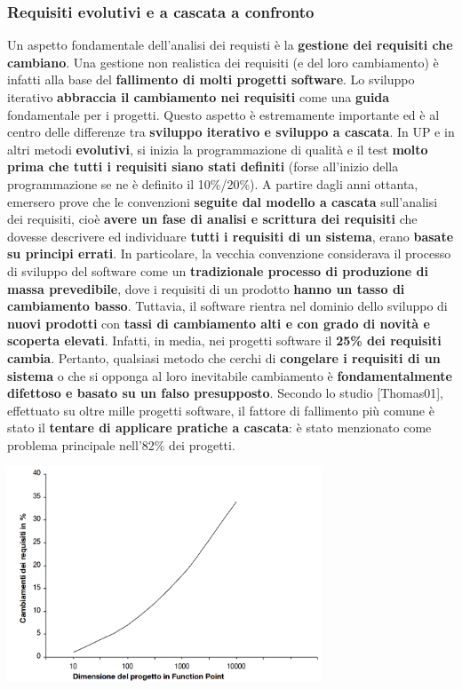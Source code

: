 \documentclass[12pt]{article}
\begin{document}
\subsubsection{Requisiti evolutivi e a cascata a confronto}
Un aspetto fondamentale dell'analisi dei requisti è la \textbf{gestione dei requisiti che cambiano}. Una gestione non realistica dei requisiti (e del loro cambiamento) è infatti alla base del \textbf{fallimento di molti progetti software}.
Lo sviluppo iterativo \textbf{abbraccia il cambiamento nei requisiti} come una \textbf{guida} fondamentale per i progetti. Questo aspetto è estremamente importante ed è al centro delle differenze tra \textbf{sviluppo iterativo e sviluppo a cascata}.
In UP e in altri metodi \textbf{evolutivi}, si inizia la programmazione di qualità e il test \textbf{molto prima che tutti i requisiti siano stati definiti} (forse all'inizio della programmazione se ne è definito il 10\%/20\%).
A partire dagli anni ottanta, emersero prove che le convenzioni \textbf{seguite dal modello a cascata} sull'analisi dei requisiti, cioè \textbf{avere un fase di analisi e scrittura dei requisiti} che dovesse descrivere ed individuare \textbf{tutti i requisiti di un sistema}, erano \textbf{basate su principi errati}.
In particolare, la vecchia convenzione considerava il processo di sviluppo del software come un \textbf{tradizionale processo di produzione di massa prevedibile}, dove i requisiti di un prodotto \textbf{hanno un tasso di cambiamento basso}.
Tuttavia, il software rientra nel dominio dello sviluppo di \textbf{nuovi prodotti} con \textbf{tassi di cambiamento alti e con grado di novità e scoperta elevati}. Infatti, in media, nei progetti software il \textbf{25\% dei requisiti cambia}.
Pertanto, qualsiasi metodo che cerchi di \textbf{congelare i requisiti di un sistema} o che si opponga al loro inevitabile cambiamento è \textbf{fondamentalmente difettoso e basato su un falso presupposto}.
Secondo lo studio [Thomas01], effettuato su oltre mille progetti software, il fattore di fallimento più comune è stato il \textbf{tentare di applicare pratiche a cascata}: è stato menzionato come problema principale nell'82\% dei progetti.
\begin{center}
    \includegraphics[width = 0.70\textwidth]{Images/15.png}
\end{center}
\end{document}
